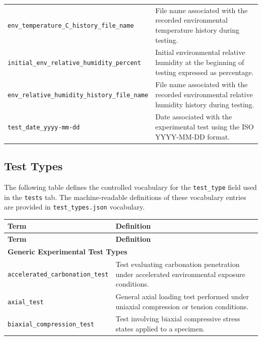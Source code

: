 \documentclass[11pt]{book}
\begin{document}
{\begin{longtable}{p{}p{}}
\texttt{env\_temperature\_C\_history\_file\_name} &
File name associated with the recorded environmental temperature history during testing. \\

\texttt{initial\_env\_relative\_humidity\_percent} &
Initial environmental relative humidity at the beginning of testing expressed as percentage. \\

\texttt{env\_relative\_humidity\_history\_file\_name} &
File name associated with the recorded environmental relative humidity history during testing. \\

\texttt{test\_date\_yyyy-mm-dd} &
Date associated with the experimental test using the ISO YYYY-MM-DD format. \\

\hline
\end{longtable}



\subsection{Test Types}
\label{vocab:test_type_list}

The following table defines the controlled vocabulary for the \texttt{test\_type} field used in the \texttt{tests} tab. The machine-readable definitions of these vocabulary entries are provided in \texttt{test\_types.json} vocabulary.

\begin{longtable}{p{}p{}}
\hline
\textbf{Term} & \textbf{Definition} \\
\hline
\endfirsthead

\hline
\textbf{Term} & \textbf{Definition} \\
\hline
\endhead

\multicolumn{2}{l}{\textbf{Generic Experimental Test Types}}\\
\hline

\texttt{accelerated\_carbonation\_test} &
Test evaluating carbonation penetration under accelerated environmental exposure conditions. \\

\texttt{axial\_test} &
General axial loading test performed under uniaxial compression or tension conditions. \\

\texttt{biaxial\_compression\_test} &
Test involving biaxial compressive stress states applied to a specimen. \\


\end{longtable}}
\end{document}
